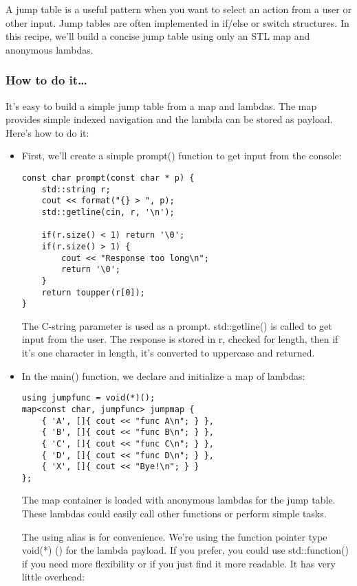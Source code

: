 
A jump table is a useful pattern when you want to select an action from a user or other input. Jump tables are often implemented in if/else or switch structures. In this recipe, we'll build a concise jump table using only an STL map and anonymous lambdas.


\subsubsection{How to do it…}

It's easy to build a simple jump table from a map and lambdas. The map provides simple indexed navigation and the lambda can be stored as payload. Here's how to do it:

\begin{itemize}
\item 
First, we'll create a simple prompt() function to get input from the console:

\begin{lstlisting}[style=styleCXX]
const char prompt(const char * p) {
	std::string r;
	cout << format("{} > ", p);
	std::getline(cin, r, '\n');
	
	if(r.size() < 1) return '\0';
	if(r.size() > 1) {
		cout << "Response too long\n";
		return '\0';
	}
	return toupper(r[0]);
}
\end{lstlisting}

The C-string parameter is used as a prompt. std::getline() is called to get input from the user. The response is stored in r, checked for length, then if it's one character in length, it's converted to uppercase and returned.

\item 
In the main() function, we declare and initialize a map of lambdas:

\begin{lstlisting}[style=styleCXX]
using jumpfunc = void(*)();
map<const char, jumpfunc> jumpmap {
	{ 'A', []{ cout << "func A\n"; } },
	{ 'B', []{ cout << "func B\n"; } },
	{ 'C', []{ cout << "func C\n"; } },
	{ 'D', []{ cout << "func D\n"; } },
	{ 'X', []{ cout << "Bye!\n"; } }
};
\end{lstlisting}

The map container is loaded with anonymous lambdas for the jump table.
These lambdas could easily call other functions or perform simple tasks.

The using alias is for convenience. We're using the function pointer type void(*) () for the lambda payload. If you prefer, you could use std::function() if you need more flexibility or if you just find it more readable. It has very little overhead:


\end{itemize}
